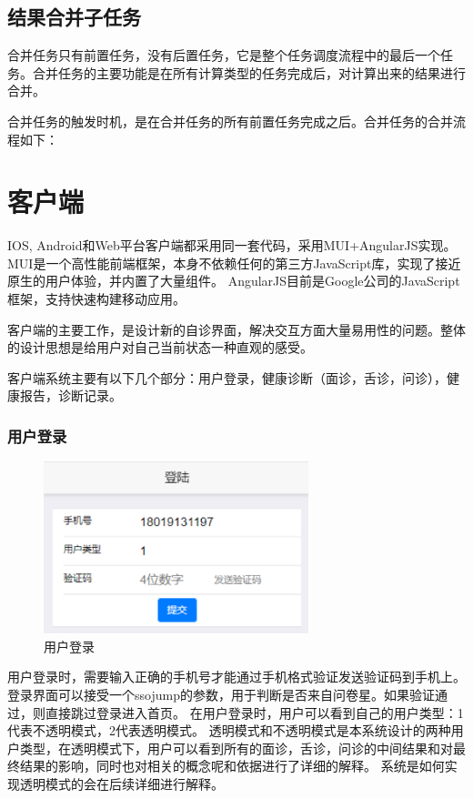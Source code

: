 \subsection{结果合并子任务}
合并任务只有前置任务，没有后置任务，它是整个任务调度流程中的最后一个任务。合并任务的主要功能是在所有计算类型的任务完成后，对计算出来的结果进行合并。

合并任务的触发时机，是在合并任务的所有前置任务完成之后。合并任务的合并流程如下：



\section{客户端}
IOS, Android和Web平台客户端都采用同一套代码，采用MUI+AngularJS实现。
MUI是一个高性能前端框架，本身不依赖任何的第三方JavaScript库，实现了接近原生的用户体验，并内置了大量组件。
AngularJS目前是Google公司的JavaScript框架，支持快速构建移动应用。

客户端的主要工作，是设计新的自诊界面，解决交互方面大量易用性的问题。整体的设计思想是给用户对自己当前状态一种直观的感受。

客户端系统主要有以下几个部分：用户登录，健康诊断（面诊，舌诊，问诊），健康报告，诊断记录。

\subsubsection{用户登录}
\begin{figure}[ht]
    \centering
    \includegraphics[height=5cm]{images/login.png}
    \caption{用户登录}
    \label{fig:login}
\end{figure} 
用户登录时，需要输入正确的手机号才能通过手机格式验证发送验证码到手机上。登录界面可以接受一个ssojump的参数，用于判断是否来自问卷星。如果验证通过，则直接跳过登录进入首页。
在用户登录时，用户可以看到自己的用户类型：1代表不透明模式，2代表透明模式。
透明模式和不透明模式是本系统设计的两种用户类型，在透明模式下，用户可以看到所有的面诊，舌诊，问诊的中间结果和对最终结果的影响，同时也对相关的概念呢和依据进行了详细的解释。
系统是如何实现透明模式的会在后续详细进行解释。

